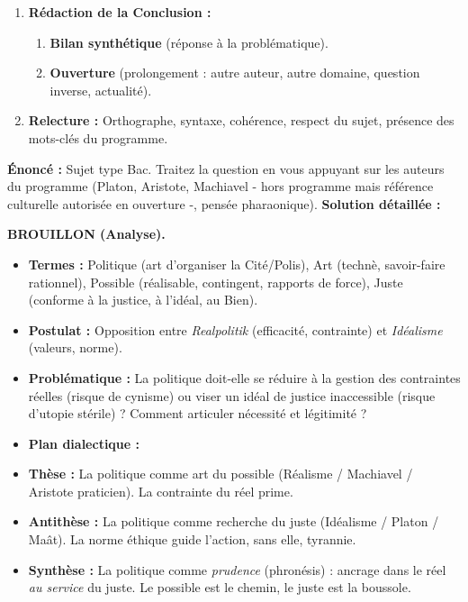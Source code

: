 \documentclass[11pt]{article}
\newcommand{\cle}[1]{{\popxbold\color{popdark}#1}}
\begin{document}
\begin{methode}
\begin{enumerate}
\begin{itemize}
        \end{itemize}
    \item \textbf{Rédaction de la Conclusion :}
        \begin{enumerate}
            \item \textbf{Bilan synthétique} (réponse à la problématique).
            \item \textbf{Ouverture} (prolongement : autre auteur, autre domaine, question inverse, actualité).
        \end{enumerate}
    \item \textbf{Relecture :} Orthographe, syntaxe, cohérence, respect du sujet, présence des \cle{mots-clés} du programme.
\end{enumerate}
\end{methode}

\begin{exoresolu}
\textbf{Énoncé :} Sujet type Bac. Traitez la question en vous appuyant sur les auteurs du programme (Platon, Aristote, Machiavel - hors programme mais référence culturelle autorisée en ouverture -, pensée pharaonique).
\tcblower
\textbf{Solution détaillée :}

\textbf{BROUILLON (Analyse).}
\begin{itemize}
    \item \textbf{Termes :} \cle{Politique} (art d'organiser la Cité/Polis), \cle{Art} (technè, savoir-faire rationnel), \cle{Possible} (réalisable, contingent, rapports de force), \cle{Juste} (conforme à la justice, à l'idéal, au Bien).
    \item \textbf{Postulat :} Opposition entre \emph{Realpolitik} (efficacité, contrainte) et \emph{Idéalisme} (valeurs, norme).
    \item \textbf{Problématique :} La politique doit-elle se réduire à la gestion des contraintes réelles (risque de cynisme) ou viser un idéal de justice inaccessible (risque d'utopie stérile) ? Comment articuler nécessité et légitimité ?
    \item \textbf{Plan dialectique :}
        \item \textbf{Thèse :} La politique comme art du possible (Réalisme / Machiavel / Aristote praticien). La contrainte du réel prime.
        \item \textbf{Antithèse :} La politique comme recherche du juste (Idéalisme / Platon / Maât). La norme éthique guide l'action, sans elle, tyrannie.
        \item \textbf{Synthèse :} La politique comme \emph{prudence} (phronésis) : ancrage dans le réel \emph{au service} du juste. Le possible est le chemin, le juste est la boussole.
\end{itemize}


\end{exoresolu}
\end{document}

